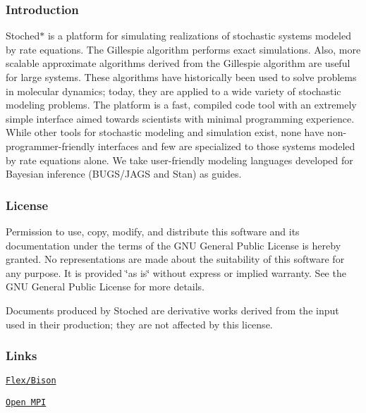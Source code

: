 \subsubsection*{Introduction}

Stoched$\ast$ is a platform for simulating realizations of stochastic systems modeled by rate equations. The Gillespie algorithm performs exact simulations. Also, more scalable approximate algorithms derived from the Gillespie algorithm are useful for large systems. These algorithms have historically been used to solve problems in molecular dynamics; today, they are applied to a wide variety of stochastic modeling problems. The platform is a fast, compiled code tool with an extremely simple interface aimed towards scientists with minimal programming experience. While other tools for stochastic modeling and simulation exist, none have non-\/programmer-\/friendly interfaces and few are specialized to those systems modeled by rate equations alone. We take user-\/friendly modeling languages developed for Bayesian inference (B\+U\+G\+S/\+J\+A\+GS and Stan) as guides.

\subsubsection*{License}

Permission to use, copy, modify, and distribute this software and its documentation under the terms of the G\+NU General Public License is hereby granted. No representations are made about the suitability of this software for any purpose. It is provided \char`\"{}as is\char`\"{} without express or implied warranty. See the G\+NU General Public License for more details.

Documents produced by Stoched are derivative works derived from the input used in their production; they are not affected by this license.

\subsubsection*{Links}

\href{https://www.gnu.org/software/bison/}{\tt Flex/\+Bison}

\href{https://www.open-mpi.org/}{\tt Open M\+PI} 